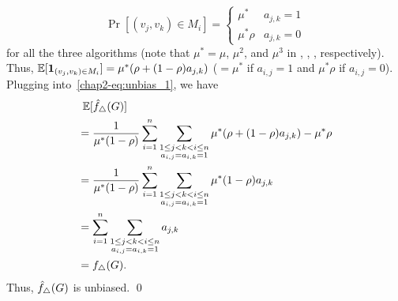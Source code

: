 {\[  \Pr[(v_j, v_k) \in M_i] =
  \begin{cases}
    \mu^* & a_{j,k} = 1 \\
    \mu^*\rho & a_{j,k} = 0
  \end{cases}
\]
for all the three algorithms (note that $\mu^* = \mu$, $\mu^2$, and $\mu^3$ in \AlgOne{}, \AlgTwo{}, \AlgThree{}, respectively).
Thus, $\operatorname{\mathbb{E}}[\textbf{1}_{(v_j, v_k) \in M_i}] = \mu^* (\rho + (1-\rho) a_{j,k})$
($= \mu^*$ if $a_{i,j}=1$ and $\mu^* \rho$ if $a_{i,j}=0$).
Plugging into~\eqref{chap2-eq:unbias_1}, we have
\begin{align*}
  &\;\operatorname{\mathbb{E}}[\hat{f}_\triangle(G)] \\
  &=
  \frac{1}{\mu^*(1-\rho)}\sum_{i=1}^n \sum_{\substack{1 \leq j < k < i \leq n \\ a_{i,j} = a_{i,k} =
  1}} \mu^*(\rho + (1-\rho)a_{j,k}) - \mu^* \rho \\
  &= \frac{1}{\mu^*(1-\rho)}\sum_{i=1}^n \sum_{\substack{1 \leq j < k < i \leq n \\ a_{i,j} = a_{i,k} =
  1}} \mu^*(1-\rho)a_{j,k} \\
  &= \sum_{i=1}^n \sum_{\substack{1 \leq j < k < i \leq n \\ a_{i,j} = a_{i,k} =
  1}} a_{j,k} \\
  &= f_\triangle(G).
\end{align*} 
Thus, $\hat{f}_\triangle(G)$ is unbiased. \qed

}
